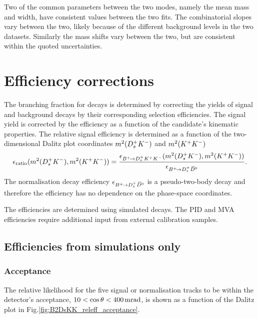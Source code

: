 Two of the common parameters between the two modes, namely the mean \Bp mass and width, have consistent values between the two fits. The combinatorial slopes vary between the two, likely because of the different background levels in the two datasets. Similarly the mass shifts vary between the two, but are consistent within the quoted uncertainties. 

\section{Efficiency corrections}
\label{sec:B2DsKK_effcorrection}

The branching fraction for \decay{\Bp}{\Dsp\Kp\Km} decays is determined by correcting the yields of signal and background decays by their corresponding selection efficiencies. 
The signal yield is corrected by the efficiency as a function of the candidate's kinematic properties. The relative signal efficiency is determined as a function of the two-dimensional Dalitz plot coordinates $m^{2}({{D}^+_{s}}{{K}^-})$ and $m^{2}({{K}^+}{{K}^-})$
\begin{equation}
\epsilon_{\text{ratio}}(m^{2}({{D}^+_{s}}{{K}^-}),m^{2}({{K}^+}{{K}^-})) = \frac{\epsilon_{{{{B}^+}}\!\rightarrow {\ensuremath{{D}^+_{s}}}{\ensuremath{{K}^+}}{\ensuremath{{K}^-}}}(m^{2}({{D}^+_{s}}{{K}^-}),m^{2}({{K}^+}{{K}^-}))}{\epsilon_{{{{B}^+}}\!\rightarrow {\ensuremath{{D}^+_{s}}}{\ensuremath{{\kern 0.2em\overline{\kern -0.2em D}{}}{}^0}}}}.
\end{equation}
The normalisation decay efficiency $\epsilon_{{{{B}^+}}\!\rightarrow {\ensuremath{{D}^+_{s}}}{\ensuremath{{\kern 0.2em\overline{\kern -0.2em D}{}}{}^0}}}$ is a pseudo-two-body decay and therefore the efficiency has no dependence on the phase-space coordinates. 

The efficiencies are determined using simulated decays. The PID and MVA efficiencies require additional input from external calibration samples.

\subsection{Efficiencies from simulations only} 


\subsubsection{Acceptance}
The relative likelihood for the five signal or normalisation tracks to be within the \lhcb detector's acceptance, $10 < \cos\theta < 400 \mathrm{ \,mrad}$, is shown as a function of the \decay{\Bp}{\Dsp\Kp\Km} Dalitz plot in Fig.\ref{fig:B2DsKK_releff_acceptance}.

